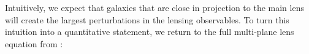 Intuitively, we expect that galaxies that are close in projection to the main lens will create the largest perturbations in the lensing observables. To turn this intuition into a quantitative statement, we return to the full multi-plane lens equation from \citet{PLW}: